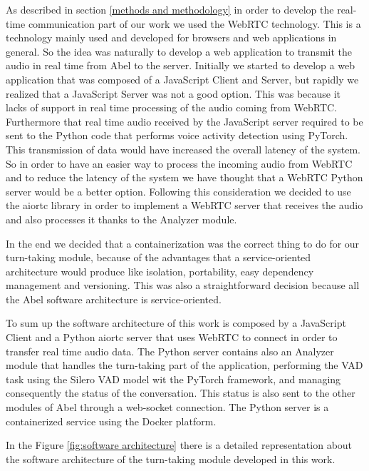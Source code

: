 \documentclass[../main.tex]{subfiles}
\begin{document}
As described in section \ref{methods and methodology} in order to develop the real-time communication part of our work we used the WebRTC technology. This is a technology mainly used and developed for browsers and web applications in general. So the idea was naturally to develop a web application to transmit the audio in real time from Abel to the server. Initially we started to develop a web application that was composed of a JavaScript Client and Server, but rapidly we realized that a JavaScript Server was not a good option. This was because it lacks of support in real time processing of the audio coming from WebRTC. Furthermore that real time audio received by the JavaScript server required to be sent to the Python code that performs voice activity detection using PyTorch. This transmission of data would have increased the overall latency of the system. So in order to have an easier way to process the incoming audio from WebRTC and to reduce the latency of the system we have thought that a WebRTC Python server would be a better option. Following this consideration we decided to use the aiortc library in order to implement a WebRTC server that receives the audio and also processes it thanks to the Analyzer module. 

In the end we decided that a containerization was the correct thing to do for our turn-taking module, because of the advantages that a service-oriented architecture would produce like isolation, portability, easy dependency management and versioning. This was also a straightforward decision because all the Abel software architecture is service-oriented. 

To sum up the software architecture of this work is composed by a JavaScript Client and a Python aiortc server that uses WebRTC to connect in order to transfer real time audio data. The Python server contains also an Analyzer module that handles the turn-taking part of the application, performing the VAD task using the Silero VAD model wit the PyTorch framework, and managing consequently the status of the conversation. This status is also sent to the other modules of Abel through a web-socket connection. The Python server is a containerized service using the Docker platform.

In the Figure \ref{fig:software architecture} there is a detailed representation about the software architecture of the turn-taking module developed in this work.
\end{document}
